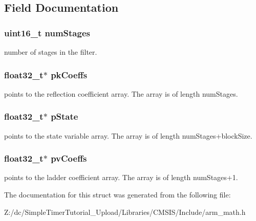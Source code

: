 \subsection{Field Documentation}
\hypertarget{structarm__iir__lattice__instance__f32_a4cceb90547b3e585d4c7aabaa8057212}{
\subsubsection[{num\-Stages}]{\setlength{\rightskip}{0pt plus 5cm}uint16\-\_\-t num\-Stages}}\label{structarm__iir__lattice__instance__f32_a4cceb90547b3e585d4c7aabaa8057212}
number of stages in the filter. \hypertarget{structarm__iir__lattice__instance__f32_a994889c5c4a866c50a0ee63326378816}{
\subsubsection[{pk\-Coeffs}]{\setlength{\rightskip}{0pt plus 5cm}float32\-\_\-t$\ast$ pk\-Coeffs}}\label{structarm__iir__lattice__instance__f32_a994889c5c4a866c50a0ee63326378816}
points to the reflection coefficient array. The array is of length num\-Stages. \hypertarget{structarm__iir__lattice__instance__f32_a335c87e6fdc4b96601d95a5de8b9c463}{
\subsubsection[{p\-State}]{\setlength{\rightskip}{0pt plus 5cm}float32\-\_\-t$\ast$ p\-State}}\label{structarm__iir__lattice__instance__f32_a335c87e6fdc4b96601d95a5de8b9c463}
points to the state variable array. The array is of length num\-Stages+block\-Size. \hypertarget{structarm__iir__lattice__instance__f32_a0f8815744fade9c580d44277ff802308}{
\subsubsection[{pv\-Coeffs}]{\setlength{\rightskip}{0pt plus 5cm}float32\-\_\-t$\ast$ pv\-Coeffs}}\label{structarm__iir__lattice__instance__f32_a0f8815744fade9c580d44277ff802308}
points to the ladder coefficient array. The array is of length num\-Stages+1. 

The documentation for this struct was generated from the following file\-:\begin{DoxyCompactItemize}
\item 
Z\-:/dc/\-Simple\-Timer\-Tutorial\-\_\-\-Upload/\-Libraries/\-C\-M\-S\-I\-S/\-Include/arm\-\_\-math.\-h\end{DoxyCompactItemize}
